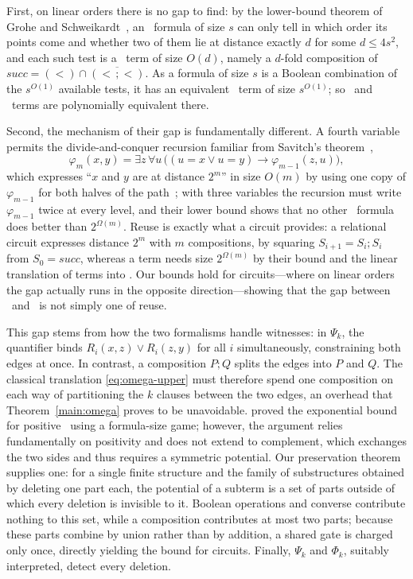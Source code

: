 First, on linear orders there is no gap to find: by the lower-bound theorem of
Grohe and Schweikardt~\citep{grohe-schweikardt2005}, an \FOthree\ formula of
size $s$ can only tell in which order its points come and whether two of
them lie at distance exactly $d$ for some $d\le4s^2$, and each such test is
a \CoR\ term of size $O(d)$, namely a $d$-fold composition of
$\mathit{succ}=(<)\cap\overline{(<\,;<)}$. As a formula of size $s$ is a
Boolean combination of the $s^{O(1)}$ available tests, it has an equivalent
\CoR\ term of size $s^{O(1)}$; so \FOthree\ and \CoR\ terms are
polynomially equivalent there.

Second, the mechanism of their gap is fundamentally different. A fourth variable
permits the divide-and-conquer recursion familiar from Savitch's theorem~\citep{savitch1970},
\[
 \varphi_m(x,y) = \exists z\,\forall u\,\bigl((u=x\lor u=y)\to
 \varphi_{m-1}(z,u)\bigr),
\]
which expresses ``$x$ and $y$ are at distance $2^m$'' in size $O(m)$ by
using one copy of $\varphi_{m-1}$ for both halves of the
path~\citep{grohe-schweikardt2005}; with three variables the recursion must
write $\varphi_{m-1}$ twice at every level, and their lower bound shows
that no other \FOthree\ formula does better than $2^{\Omega(m)}$.
Reuse is exactly what a circuit provides: a relational circuit expresses
distance $2^m$ with $m$ compositions, by squaring $S_{i+1}=S_i;S_i$ from
$S_0=\mathit{succ}$, whereas a term needs size $2^{\Omega(m)}$ by their
bound and the linear translation of terms into \FOthree. Our bounds hold for
circuits---where on linear orders the gap actually runs in the opposite
direction---showing that the gap between \FOthree\ and \CoR\ is not simply
one of reuse.

This gap stems from how the two formalisms handle witnesses: in $\Psi_k$, the
quantifier binds $R_i(x,z)\lor R_i(z,y)$ for all $i$ simultaneously,
constraining both edges at once. In contrast, a composition $P;Q$ splits the
edges into $P$ and $Q$. The classical translation \eqref{eq:omega-upper} must
therefore spend one composition on each way of partitioning the $k$ clauses
between the two edges, an overhead that Theorem~\ref{main:omega} proves to be
unavoidable. \citet{nakamura2022} proved the exponential bound for positive
\CoR\ using a formula-size game; however, the argument relies fundamentally on
positivity and does not extend to complement, which exchanges the two sides
and thus requires a symmetric potential. Our preservation theorem supplies
one: for a single finite structure and the family of substructures obtained by
deleting one part each, the potential of a subterm is a set of parts outside
of which every deletion is invisible to it. Boolean operations and converse
contribute nothing to this set, while a composition contributes at most two
parts; because these parts combine by union rather than by addition, a shared
gate is charged only once, directly yielding the bound for circuits. Finally,
$\Psi_k$ and $\Phi_k$, suitably interpreted, detect every deletion.

